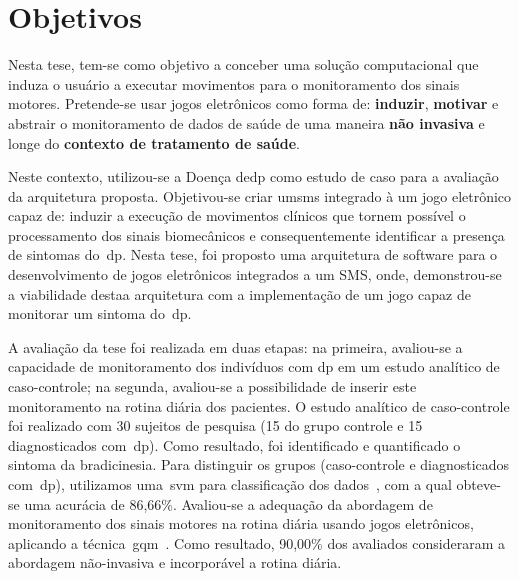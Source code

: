 \section{Objetivos}\label{section:objetivos}
Nesta tese, tem-se como objetivo a conceber uma solução computacional que induza o usuário a executar movimentos para o monitoramento dos sinais motores. Pretende-se usar jogos eletrônicos como forma de: \textbf{induzir}, \textbf{motivar} e abstrair o monitoramento de dados de saúde de uma maneira \textbf{não invasiva} e longe do \textbf{contexto de tratamento de saúde}.

Neste contexto, utilizou-se a Doença de\ac{dp} como estudo de caso para a avaliação da arquitetura proposta. Objetivou-se criar um\ac{sms} integrado à um jogo eletrônico capaz de: induzir a execução de movimentos clínicos que tornem possível o processamento dos sinais biomecânicos e consequentemente identificar a presença de sintomas do~\ac{dp}. Nesta tese, foi proposto uma arquitetura de software para o desenvolvimento de jogos eletrônicos integrados a um SMS, onde, demonstrou-se a viabilidade destaa arquitetura com a implementação de um jogo capaz de monitorar um sintoma do~\ac{dp}.

A avaliação da tese foi realizada em duas etapas: na primeira, avaliou-se a capacidade de monitoramento dos indivíduos com \ac{dp} em um estudo analítico de caso-controle; na segunda, avaliou-se a possibilidade de inserir este monitoramento na rotina diária dos pacientes. O estudo analítico de caso-controle foi realizado com 30 sujeitos de pesquisa (15 do grupo controle e 15 diagnosticados com~\ac{dp}). Como resultado, foi identificado e quantificado o sintoma da bradicinesia. Para distinguir os grupos (caso-controle e diagnosticados com~\ac{dp}), utilizamos uma~\ac{svm} para classificação dos dados~\cite{datamining2005}, com a qual obteve-se uma acurácia de 86,66\%. Avaliou-se a adequação da abordagem de monitoramento dos sinais motores na rotina diária usando jogos eletrônicos, aplicando a técnica~\ac{gqm}~\cite{van1999goal}. Como resultado, 90,00\% dos avaliados consideraram a abordagem não-invasiva e incorporável a rotina diária. 

